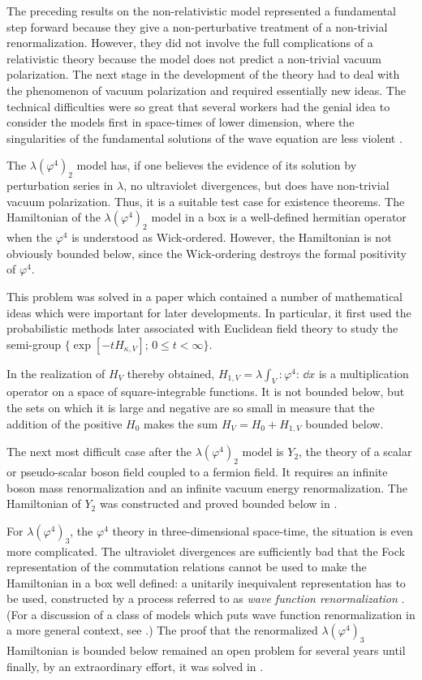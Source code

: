 The preceding results on the non-relativistic model represented a fundamental
step forward because they give a non-perturbative treatment of a non-trivial
renormalization. However, they did not involve the full complications of a
relativistic theory because the model does not predict a non-trivial vacuum
polarization. The next stage in the development of the theory had to deal with
the phenomenon of vacuum polarization and required essentially new ideas. The
technical difficulties were so great that several workers had the genial idea
to consider the models first in space-times of lower dimension, where the
singularities of the fundamental solutions of the wave equation are less
violent \cite{pct-app-15,pct-app-16,pct-app-17,pct-app-18,pct-app-19}.

The $\lambda(\varphi^4)_2$ model has, if one believes the evidence of its
solution by perturbation series in $\lambda$, no ultraviolet divergences, but
does have non-trivial vacuum polarization. Thus, it is a suitable test case
for existence theorems. The Hamiltonian of the $\lambda(\varphi^4)_2$ model in
a box is a well-defined hermitian operator when the $\varphi^4$ is understood
as Wick-ordered. However, the Hamiltonian is not obviously bounded below,
since the Wick-ordering destroys the formal positivity of $\varphi^4$.

This problem was solved in a paper \cite{pct-app-15} which contained a number of
mathematical ideas which were important for later developments. In particular,
it first used the probabilistic methods later associated with Euclidean field
theory to study the semi-group
$\bigl\{\exp[-tH_{\kappa,V}];\,0\leq t<\infty\bigr\}$.

In the realization of $H_V$ thereby obtained,
$H_{1,V}=\lambda\int_V :\varphi^4:\,\dd x$
is a multiplication operator on a space of square-integrable functions. It is
not bounded below, but the sets on which it is large and negative are so small
in measure that the addition of the positive $H_0$ makes the sum
$H_V=H_0+H_{1,V}$
bounded below.

The next most difficult case after the $\lambda(\varphi^4)_2$ model is $Y_2$,
the theory of a scalar or pseudo-scalar boson field coupled to a fermion field.
It requires an infinite boson mass renormalization and an infinite vacuum
energy renormalization. The Hamiltonian of $Y_2$ was constructed and proved
bounded below in \cite{pct-app-16,pct-app-17,pct-app-19}.

For $\lambda(\varphi^4)_3$, the $\varphi^4$ theory in three-dimensional
space-time, the situation is even more complicated. The ultraviolet
divergences are sufficiently bad that the Fock representation of the
commutation relations cannot be used to make the Hamiltonian in a box well
defined: a unitarily inequivalent representation has to be used, constructed
by a process referred to as \emph{wave function renormalization} \cite{pct-app-20}. (For a
discussion of a class of models which puts wave function renormalization in a
more general context, see \cite{pct-app-21}.) The proof that the renormalized
$\lambda(\varphi^4)_3$ Hamiltonian is bounded below remained an open problem
for several years until finally, by an extraordinary effort, it was solved in
\cite{pct-app-22}.


